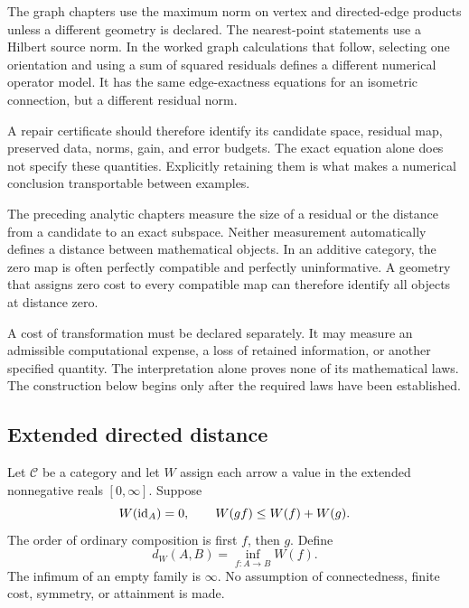 The graph chapters use the maximum norm on vertex and directed-edge products unless a different geometry is declared. The nearest-point statements use a Hilbert source norm. In the worked graph calculations that follow, selecting one orientation and using a sum of squared residuals defines a different numerical operator model. It has the same edge-exactness equations for an isometric connection, but a different residual norm.

A repair certificate should therefore identify its candidate space, residual map, preserved data, norms, gain, and error budgets. The exact equation alone does not specify these quantities. Explicitly retaining them is what makes a numerical conclusion transportable between examples.




\label{KS:sec:transport-cost}
The preceding analytic chapters measure the size of a residual or the distance from a candidate to an exact subspace. Neither measurement automatically defines a distance between mathematical objects. In an additive category, the zero map is often perfectly compatible and perfectly uninformative. A geometry that assigns zero cost to every compatible map can therefore identify all objects at distance zero.

A cost of transformation must be declared separately. It may measure an admissible computational expense, a loss of retained information, or another specified quantity. The interpretation alone proves none of its mathematical laws. The construction below begins only after the required laws have been established.

\subsection{Extended directed distance}
Let \(\mathcal C\) be a category and let \(W\) assign each arrow a value in the extended nonnegative reals \([0,\infty]\). Suppose
\[
 W(\operatorname{id}_A)=0,\qquad W(gf)\le W(f)+W(g).
\]
The order of ordinary composition is first \(f\), then \(g\). Define
\[
 d_W(A,B)=\inf_{f:A\to B}W(f).
\]
The infimum of an empty family is \(\infty\). No assumption of connectedness, finite cost, symmetry, or attainment is made.

